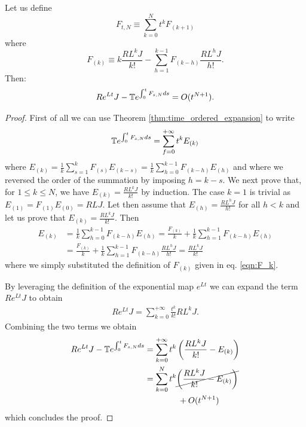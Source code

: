 \documentclass[10pt,aps,pra,twocolumn,showpacs,superscriptaddress,nobalancelastpage,notitlepage,nofootinbib,longbibliography]{revtex4-2}
\begin{document}
\begin{theorem}
\label{thm:approx}
Let us define 
\begin{equation}
F_{t,N} \equiv \sum_{k=0}^{N} t^k F_{(k+1)}
\label{eqn:poly_generator}
\end{equation}
where 
\begin{equation}
F_{(k)} \equiv k\frac{R L^k J}{k!} - \sum_{h=1}^{k-1}F_{(k-h)}\frac{R L^h J}{h!}.
\label{eqn:F_k}
\end{equation}
Then:
\begin{align}
R e^{L t}J - \mathbb{T} e^{\int_0^t F_{s,N} ds} = O(t^{N+1}).
\label{eqn:time_approx}
\end{align}
\end{theorem}
\begin{proof}%
First of all we can use Theorem \ref{thm:time_ordered_expansion} to write 
\[\mathbb{T} e^{\int_0^t F_{s,N} ds} = \sum_{f=0}^{+\infty} t^k E_{(k)}\]
where \(E_{(k)} =  \frac{1}{k} \sum_{s=1}^{k} F_{(s)}E_{(k-s)}= \frac{1}{k}\sum_{h=0}^{k-1} F_{(k-h)}E_{(h)}\) and where we reversed the order of the summation by imposing $h=k-s$. We next prove that, for $1\leq k \leq N$, we have $E_{(k)}=\frac{RL^kJ}{k!}$ by induction. The case $k=1$ is trivial as $E_{(1)} = F_{(1)}E_{(0)} = RLJ$. Let then assume that $E_{(h)} = \frac{RL^hJ}{h!}$ for all $h<k$ and let us prove that $E_{(k)}=\frac{RL^k J}{k!}$. Then
\begin{align*}
    E_{(k)} &= \frac{1}{k}\sum_{h=0}^{k-1} F_{(k-h)}E_{(h)} = \frac{F_{(k)}}{k} + \frac{1}{k}\sum_{h=1}^{k-1}F_{(k-h)}E_{(h)}\\
    &= \frac{F_{(k)}}{k} + \frac{1}{k}\sum_{h=1}^{k-1}F_{(k-h)}\frac{RL^h J}{h!}
    = \frac{R L^k J}{k!}
\end{align*}
where we simply substituted the definition of $F_{(k)}$ given in eq. \eqref{eqn:F_k}.

By leveraging the definition of the exponential map $e^{L t}$ we can expand the term $R e^{L t}J$ to obtain
\begin{align*}
    R e^{L t} J = \sum_{k=0}^{+\infty} \frac{t^k}{k!} RL^k J.
\end{align*}
Combining the two terms we obtain
\begin{align*}
    R e^{L t}J - \mathbb{T} e^{\int_0^t F_{s,N} ds} &= \sum_{k=0}^{+\infty}t^k\left(\frac{RL^k J}{k!} - E_{(k)}\right) \\
    &= \sum_{k=0}^{N}t^k\cancel{\left(\frac{RL^k J}{k!} - E_{(k)}\right)}\\ &\qquad\qquad + O(t^{N+1})
\end{align*}
which concludes the proof.
\end{proof}
\end{document}

